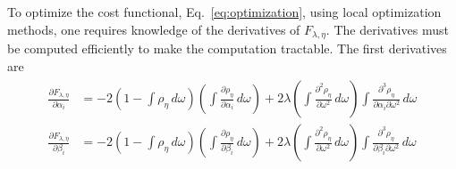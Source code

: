To optimize the cost functional, Eq.~\eqref{eq:optimization}, using local optimization methods, one requires knowledge of the derivatives of $F_{\lambda, \eta}$. The derivatives must be computed efficiently to make the computation tractable. The first derivatives are
\begin{align}
    \begin{split}
        \frac{\partial F_{\lambda,\eta}}{\partial \alpha_i} &= -2\left( 1 - \int \rho_\eta \,d\omega \right) \left( \int \frac{\partial \rho_\eta}{\partial \alpha_i}\,d\omega \right) + 2\lambda \left( \int \frac{\partial^2 \rho_\eta}{\partial \omega^2}\,d\omega \right) \int \frac{\partial^3 \rho_\eta}{\partial \alpha_i \partial \omega^2}\,d\omega \\
        \frac{\partial F_{\lambda,\eta}}{\partial \beta_i} &= -2\left( 1 - \int \rho_\eta \,d\omega \right) \left( \int \frac{\partial \rho_\eta}{\partial \beta_i}\,d\omega \right) + 2\lambda \left( \int \frac{\partial^2 \rho_\eta}{\partial \omega^2}\,d\omega \right) \int \frac{\partial^3 \rho_\eta}{\partial \beta_i \partial \omega^2}\,d\omega
    \end{split}
\end{align}

